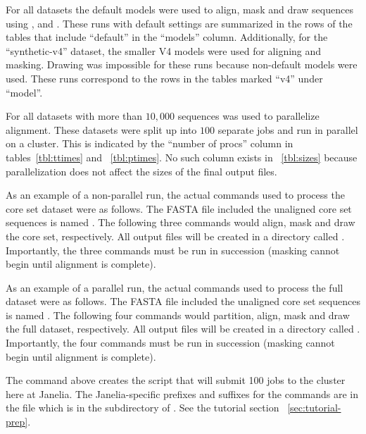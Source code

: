For all datasets the default models were used to align, mask and draw
sequences using ,  and
. These runs with default settings are summarized in the
rows of the tables that include ``default'' in the ``models'' column.
Additionally, for the ``synthetic-v4'' dataset, the smaller V4
models were used for aligning and masking. Drawing was impossible for
these runs because non-default models were used. These runs correspond
to the rows in the tables marked ``v4'' under ``model''.

For all datasets with more than $10,000$ sequences  was
used to parallelize alignment. These datasets were split up into $100$
separate jobs and run in parallel on a cluster. This is indicated by
the ``number of procs'' column in tables~\ref{tbl:ttimes} and
~\ref{tbl:ptimes}. No such column exists in ~\ref{tbl:sizes} because
parallelization does not affect the sizes of the final output files.

As an example of a non-parallel run, the actual commands used to process the
 core set dataset were as follows. The FASTA file
included the unaligned core set sequences is named . The
following three commands would align, mask and draw the core
set, respectively. All output files will be created in a directory called
. Importantly, the three commands  must be run in succession
(masking cannot begin until alignment is complete). 




As an example of a parallel run, the actual commands used to process the
 full dataset were as follows. The FASTA file
included the unaligned core set sequences is named . The
following four commands would partition, align, mask and draw the full
dataset, respectively. All output files will be created in a directory
called . Importantly, the four commands must be run in succession
(masking cannot begin until alignment is complete). 





The  command above creates the
 script that will submit 100 
jobs to the cluster here at Janelia. The Janelia-specific prefixes and
suffixes for the commands are in the file
 which is in the 
subdirectory of . See the tutorial section
~\ref{sec:tutorial-prep}.

